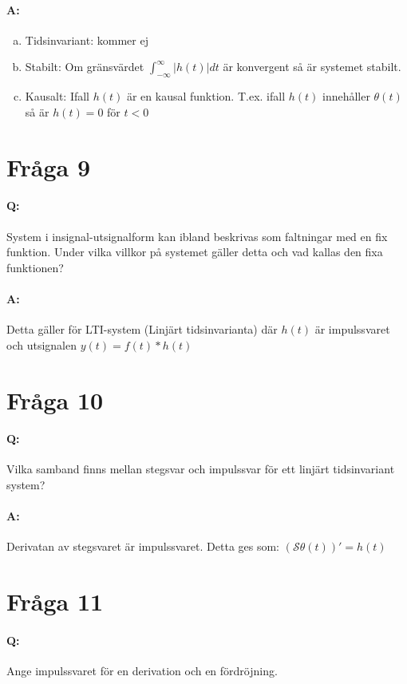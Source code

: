 \documentclass[a4paper]{article}
\begin{document}
\paragraph{A:}
\begin{enumerate}[b)]
\item Tidsinvariant: kommer ej
\item Stabilt: Om gränsvärdet $\int_{-\infty}^{\infty} |h(t)|dt$ är konvergent så är systemet stabilt.
\item Kausalt: Ifall $h(t)$ är en kausal funktion. T.ex. ifall $h(t)$ innehåller $\theta(t)$ så är $h(t)=0$ för $t<0$
\end{enumerate}
\newpage
\section{Fråga 9}
\paragraph{Q:} System i insignal-utsignalform kan ibland beskrivas som faltningar med en fix funktion. Under vilka villkor på systemet gäller detta och vad kallas den fixa funktionen?
\paragraph{A:} Detta gäller för LTI-system (Linjärt tidsinvarianta) där $h(t)$ är impulssvaret och utsignalen $y(t)=f(t)*h(t)$ 

\section{Fråga 10}
\paragraph{Q:} Vilka samband finns mellan stegsvar och impulssvar för ett linjärt tidsinvariant system?
\paragraph{A:} Derivatan av stegsvaret är impulssvaret. Detta ges som: $(\mathcal{S}\theta(t))' = h(t)$

\section{Fråga 11}
\paragraph{Q:} Ange impulssvaret för en derivation och en fördröjning.
\end{document}
